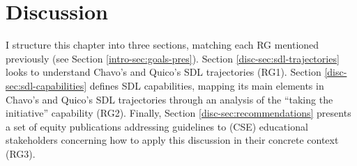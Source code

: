 \chapter{Discussion}
\label{chap:discussion}

 I structure this chapter into three sections, matching each \acrfull{RG} mentioned previously (see Section \ref{intro-sec:goals-pres}). Section \ref{disc-sec:sdl-trajectories} looks to understand Chavo's and Quico's \acrfull{SDL} trajectories (\gls{RG}1). Section \ref{disc-sec:sdl-capabilities} defines \gls{SDL} capabilities, mapping its main elements in Chavo's and Quico's \gls{SDL} trajectories through an analysis of the ``taking the initiative'' capability (\gls{RG}2). Finally, Section \ref{disc-sec:recommendations} presents a set of equity publications addressing guidelines to (\acrfull{CSE}) educational stakeholders concerning how to apply this discussion in their concrete context (\gls{RG}3).